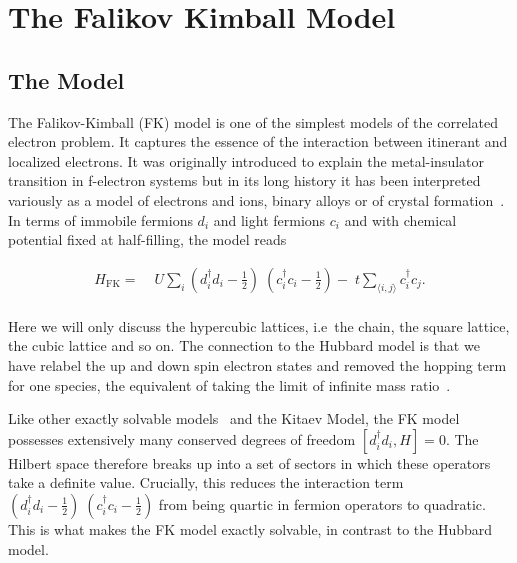 \hypertarget{the-falikov-kimball-model}{%
\section{The Falikov Kimball Model}\label{the-falikov-kimball-model}}

\hypertarget{the-model}{%
\subsection{The Model}\label{the-model}}

The Falikov-Kimball (FK) model is one of the simplest models of the correlated electron problem. It captures the essence of the interaction between itinerant and localized electrons. It was originally introduced to explain the metal-insulator transition in f-electron systems but in its long history it has been interpreted variously as a model of electrons and ions, binary alloys or of crystal formation~\autocite{hubbardj.ElectronCorrelationsNarrow1963,falicovSimpleModelSemiconductorMetal1969,gruberFalicovKimballModelReview1996,gruberFalicovKimballModel2006}. In terms of immobile fermions \(d_i\) and light fermions \(c_i\) and with chemical potential fixed at half-filling, the model reads

\[\begin{aligned}
H_{\mathrm{FK}} = & \;U \sum_{i} (d^\dagger_{i}d_{i} - \tfrac{1}{2})\;(c^\dagger_{i}c_{i} - \tfrac{1}{2}) -\;t \sum_{\langle i,j\rangle} c^\dagger_{i}c_{j}.\\ 
\end{aligned}\]

Here we will only discuss the hypercubic lattices, i.e~the chain, the square lattice, the cubic lattice and so on. The connection to the Hubbard model is that we have relabel the up and down spin electron states and removed the hopping term for one species, the equivalent of taking the limit of infinite mass ratio~\autocite{devriesSimplifiedHubbardModel1993}.

Like other exactly solvable models~\autocite{smithDisorderFreeLocalization2017} and the Kitaev Model, the FK model possesses extensively many conserved degrees of freedom \([d^\dagger_{i}d_{i}, H] = 0\). The Hilbert space therefore breaks up into a set of sectors in which these operators take a definite value. Crucially, this reduces the interaction term \((d^\dagger_{i}d_{i} - \tfrac{1}{2})\;(c^\dagger_{i}c_{i} - \tfrac{1}{2})\) from being quartic in fermion operators to quadratic. This is what makes the FK model exactly solvable, in contrast to the Hubbard model.

